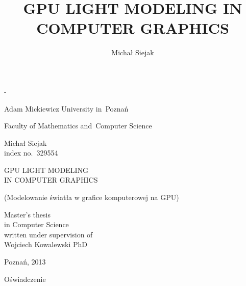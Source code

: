 \documentclass[oneside,openright,a4paper,12pt]{memoir}
\theoremstyle{definition}
\begin{document}
\title{GPU LIGHT MODELING IN COMPUTER GRAPHICS}
\author{Michał Siejak}

\frontmatter
{}

\begin{titlingpage}
\calccentering{\unitlength}
\begin{adjustwidth*}{\unitlength}{-\unitlength}
\begin{center}
  
 \begin{LARGE}
   Adam Mickiewicz University in~Poznań\\
   \begin{Large}
     Faculty of Mathematics and~Computer Science\\
   \end{Large}
   \vspace{1.5cm}
   \begin{huge}
     Michał Siejak\\
     \small{index no.~329554}\\
   \end{huge}
   \vspace{1.5cm}
   \begin{Huge}
     GPU LIGHT MODELING\\ IN COMPUTER GRAPHICS\\
   \end{Huge}
   \vspace{-0.3cm}
   \begin{footnotesize}
     (Modelowanie światła w grafice komputerowej na GPU)
   \end{footnotesize}
   \vspace{2.0cm}
    \begin{flushleft}
      \hsize
      \large
      Master's thesis\\
      in Computer Science\\
      written under supervision of\\
      Wojciech Kowalewski PhD\\
    \end{flushleft}
    \vfill
    Poznań, 2013
 \end{LARGE}
\end{center}
\end{adjustwidth*}
\end{titlingpage}

\setcounter{page}{2}

\begin{center}
  \LARGE{Oświadczenie}
\end{center}
\end{document}
